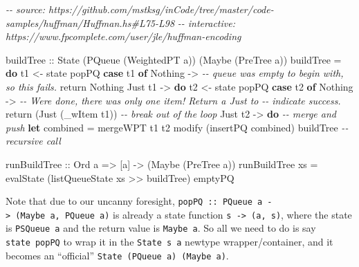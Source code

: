 \documentclass[]{article}
\newenvironment{Shaded}{}{}
\newcommand{\CommentTok}[1]{\textcolor[rgb]{0.38,0.63,0.69}{\textit{#1}}}
\newcommand{\DataTypeTok}[1]{\textcolor[rgb]{0.56,0.13,0.00}{#1}}
\newcommand{\FunctionTok}[1]{\textcolor[rgb]{0.02,0.16,0.49}{#1}}
\newcommand{\KeywordTok}[1]{\textcolor[rgb]{0.00,0.44,0.13}{\textbf{#1}}}
\newcommand{\NormalTok}[1]{#1}
\newcommand{\OperatorTok}[1]{\textcolor[rgb]{0.40,0.40,0.40}{#1}}
\newcommand{\OtherTok}[1]{\textcolor[rgb]{0.00,0.44,0.13}{#1}}
\begin{document}
\begin{Shaded}
\begin{Highlighting}[]
\CommentTok{{-}{-} source: https://github.com/mstksg/inCode/tree/master/code{-}samples/huffman/Huffman.hs\#L75{-}L98}
\CommentTok{{-}{-} interactive: https://www.fpcomplete.com/user/jle/huffman{-}encoding}

\OtherTok{buildTree ::} \DataTypeTok{State}\NormalTok{ (}\DataTypeTok{PQueue}\NormalTok{ (}\DataTypeTok{WeightedPT}\NormalTok{ a)) (}\DataTypeTok{Maybe}\NormalTok{ (}\DataTypeTok{PreTree}\NormalTok{ a))}
\NormalTok{buildTree }\OtherTok{=} \KeywordTok{do}
\NormalTok{    t1\textquotesingle{} }\OtherTok{<{-}}\NormalTok{ state popPQ}
    \KeywordTok{case}\NormalTok{ t1\textquotesingle{} }\KeywordTok{of}
      \DataTypeTok{Nothing} \OtherTok{{-}>}
        \CommentTok{{-}{-} queue was empty to begin with, so this fails.}
        \FunctionTok{return} \DataTypeTok{Nothing}
      \DataTypeTok{Just}\NormalTok{ t1 }\OtherTok{{-}>} \KeywordTok{do}
\NormalTok{        t2\textquotesingle{} }\OtherTok{<{-}}\NormalTok{ state popPQ}
        \KeywordTok{case}\NormalTok{ t2\textquotesingle{} }\KeywordTok{of}
          \DataTypeTok{Nothing}  \OtherTok{{-}>}
            \CommentTok{{-}{-} We\textquotesingle{}re done, there was only one item!  Return a \textasciigrave{}Just\textasciigrave{} to}
            \CommentTok{{-}{-} indicate success.}
            \FunctionTok{return}\NormalTok{ (}\DataTypeTok{Just}\NormalTok{ (\_wItem t1))     }\CommentTok{{-}{-} break out of the loop}
          \DataTypeTok{Just}\NormalTok{ t2 }\OtherTok{{-}>} \KeywordTok{do}
            \CommentTok{{-}{-} merge and push}
            \KeywordTok{let}\NormalTok{ combined }\OtherTok{=}\NormalTok{ mergeWPT t1 t2}
\NormalTok{            modify (insertPQ combined)}
\NormalTok{            buildTree                     }\CommentTok{{-}{-} recursive call}

\OtherTok{runBuildTree ::} \DataTypeTok{Ord}\NormalTok{ a }\OtherTok{=>}\NormalTok{ [a] }\OtherTok{{-}>}\NormalTok{ (}\DataTypeTok{Maybe}\NormalTok{ (}\DataTypeTok{PreTree}\NormalTok{ a))}
\NormalTok{runBuildTree xs }\OtherTok{=}\NormalTok{ evalState (listQueueState xs }\OperatorTok{>>}\NormalTok{ buildTree) emptyPQ}
\end{Highlighting}
\end{Shaded}

Note that due to our uncanny foresight,
\texttt{popPQ\ ::\ PQueue\ a\ -\textgreater{}\ (Maybe\ a,\ PQueue\ a)} is
already a state function \texttt{s\ -\textgreater{}\ (a,\ s)}, where the state
is \texttt{PSQueue\ a} and the return value is \texttt{Maybe\ a}. So all we need
to do is say \texttt{state\ popPQ} to wrap it in the \texttt{State\ s\ a}
newtype wrapper/container, and it becomes an ``official''
\texttt{State\ (PQueue\ a)\ (Maybe\ a)}.
\end{document}
